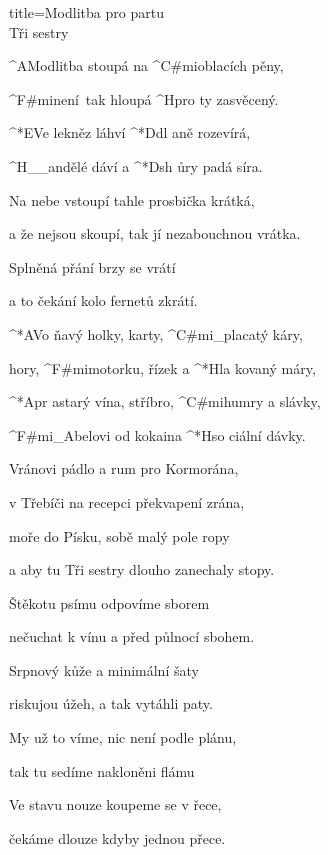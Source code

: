 \begin{song}{title=\predtitle\centering Modlitba pro partu \\\large Tři sestry \vspace*{-0.3cm}}  %
\begin{centerjustified}

\sloka 
	^{A\z}Modlitba stoupá na ^{C#mi\z}oblacích pěny,

	^{F#mi\z}není~tak hloupá ^{H}pro ty zasvěcený.

	^*{E}Ve lekněz láhví ^*{D}dl aně rozevírá,

	^{H{\color{white}\_\_}}andělé dáví a ^*{D}sh ůry padá síra.

\sloka
	Na nebe vstoupí tahle prosbička krátká,

   	a že nejsou skoupí, tak jí nezabouchnou vrátka.

   	Splněná přání brzy se vrátí

   	a to čekání kolo fernetů zkrátí.

	^*{A}Vo ňavý holky, karty, ^{C#mi{\color{white}\_}}placatý káry,
	
	hory, ^{F#mi\z}motorku, řízek a ^*{H}la kovaný máry,

	^*{A}pr astarý vína, stříbro, ^{C#mi}humry a slávky,

	^{F#mi{\color{white}\_}}Abelovi od kokaina ^*{H}so ciální dávky.
	
	\phantom{.}
	
	Vránovi pádlo a rum pro Kormorána,

   	v Třebíči na recepci překvapení zrána,

   	moře do Písku, sobě malý pole ropy

   	a aby tu Tři sestry dlouho zanechaly stopy.

\sloka
	Štěkotu psímu odpovíme sborem

   	nečuchat k vínu a před půlnocí sbohem.

   	Srpnový kůže a minimální šaty

   	riskujou úžeh, a tak vytáhli paty.

\sloka
	My už to víme, nic není podle plánu,
   
   	tak tu sedíme nakloněni flámu
   	
   	Ve stavu nouze koupeme se v řece,
   
   	čekáme dlouze kdyby jednou přece.
   	


\end{centerjustified}
\setcounter{Slokočet}{0}
\end{song}
